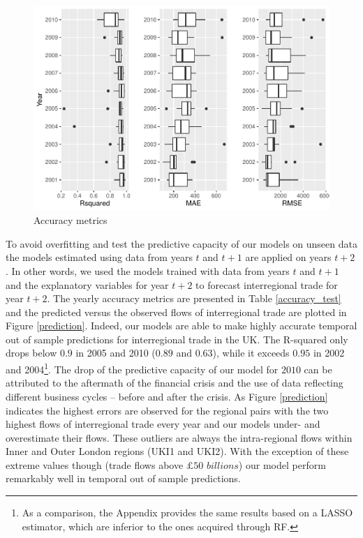 \documentclass[]{interact}
\theoremstyle{plain}%
\theoremstyle{definition}
\theoremstyle{remark}
\begin{document}
\begin{figure}[p]
\includegraphics[width=1\linewidth]{hl_v2_files/figure-latex/unnamed-chunk-3-1} \caption{\label{accuracy_insample}Accuracy metrics}\label{fig:unnamed-chunk-3}
\end{figure}

To avoid overfitting and test the predictive capacity of our models on
unseen data the models estimated using data from years \(t\) and
\(t + 1\) are applied on years \(t + 2\). In other words, we used the
models trained with data from years \(t\) and \(t + 1\) and the
explanatory variables for year \(t + 2\) to forecast interregional trade
for year \(t + 2\). The yearly accuracy metrics are presented in Table
\ref{accuracy_test} and the predicted versus the observed flows of
interregional trade are plotted in Figure \ref{prediction}. Indeed, our
models are able to make highly accurate temporal out of sample
predictions for interregional trade in the UK. The R-squared only drops
below \(0.9\) in 2005 and 2010 (\(0.89\) and \(0.63\)), while it exceeds
\(0.95\) in 2002 and 2004\footnote{As a comparison, the Appendix
  provides the same results based on a LASSO estimator, which are
  inferior to the ones acquired through RF.}. The drop of the predictive
capacity of our model for \(2010\) can be attributed to the aftermath of
the financial crisis and the use of data reflecting different business
cycles -- before and after the crisis. As Figure \ref{prediction}
indicates the highest errors are observed for the regional pairs with
the two highest flows of interregional trade every year and our models
under- and overestimate their flows. These outliers are always the
intra-regional flows within Inner and Outer London regions (UKI1 and
UKI2). With the exception of these extreme values though (trade flows
above \(\pounds 50\) \(billions\)) our model perform remarkably well in
temporal out of sample predictions.
\end{document}
